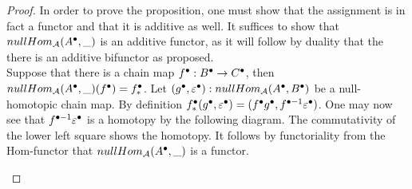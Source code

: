     \begin{proof}
        In order to prove the proposition, one must show that the assignment is in fact a functor and that it is additive as well. It suffices to show that $nullHom_{\mathcal{A}}(A^{\bullet},\_)$ is an additive functor, as it will follow by duality that the there is an additive bifunctor as proposed. \\
        
        Suppose that there is a chain map $f^{\bullet}:B^{\bullet}\rightarrow C^{\bullet}$, then $nullHom_{\mathcal{A}}(A^{\bullet},\_)(f^{\bullet})=f^{\bullet}_*$. Let $(g^{\bullet},\varepsilon^{\bullet}):nullHom_{\mathcal{A}}(A^{\bullet},B^{\bullet})$ be a null-homotopic chain map. By definition $f^{\bullet}_*(g^{\bullet},\varepsilon^{\bullet})=(f^{\bullet}g^{\bullet},f^{\bullet-1}\varepsilon^{\bullet})$. One may now see that $f^{\bullet-1}\varepsilon^{\bullet}$ is a homotopy by the following diagram. The commutativity of the lower left square shows the homotopy. It follows by functoriality from the Hom-functor that $nullHom_{\mathcal{A}}(A^{\bullet},\_)$ is a functor.
        \begin{center}
        \end{center}


\end{proof}
